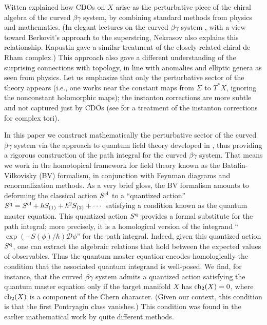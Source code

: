 Witten \cite{WittenCDO} explained how CDOs on $X$ arise as the perturbative piece of the chiral algebra of the curved $\beta\gamma$ system, by combining standard methods from physics and mathematics. (In elegant lectures on the curved $\beta\gamma$ system \cite{Nek}, with a view toward Berkovit's approach to the superstring, Nekrasov also explains this relationship.  Kapustin \cite{KapCDR} gave a similar treatment of the closely-related chiral de Rham complex.) This approach also gave a different understanding of the surprising connections with topology, in line with anomalies and elliptic genera as seen from physics. Let us emphasize that only the perturbative sector of the theory appears (i.e., one works near the constant maps from $\Sigma$ to $T^*X$, ignoring the nonconstant holomorphic maps); the instanton corrections are more subtle and not captured just by CDOs (see \cite{KapOrlov} for a treatment of the instanton corrections for complex tori).

In this paper we construct mathematically the perturbative sector of the curved $\beta\gamma$ system via the approach to quantum field theory developed in \cite{CosBook, CG1, CG2}, thus providing a rigorous construction of the path integral for the curved $\beta\gamma$ system. That means we work in the homotopical framework for field theory known as the Batalin-Vilkovisky (BV) formalism, in conjunction with Feynman diagrams and renormalization methods. As a very brief gloss, the BV formalism amounts to deforming the classical action $S^{\rm cl}$ to a ``quantized action'' $S^{\rm q} = S^{\rm cl} + \hbar S_{(1)} + \hbar^2 S_{(2)} + \cdots$ satisfying a condition known as the quantum master equation. This quantized action $S^{\rm q}$ provides a formal substitute for the path integral; more precisely, it is a homological version of the integrand ``$\exp(-S(\phi)/\hbar) \mathcal{D}\phi$'' for the path integral. Indeed, given this quantized action $S^{\rm q}$, one can extract the algebraic relations that hold between the expected values of observables. Thus the quantum master equation encodes homologically the condition that the associated quantum integrand is well-posed. We find, for instance, that the curved $\beta\gamma$ system admits a quantized action satisfying the quantum master equation only if the target manifold $X$ has ${\rm ch}_2(X) = 0$, where ${\rm ch}_2(X)$ is a component of the Chern character. (Given our context, this condition is that the first Pontryagin class vanishes.) This condition was found in the earlier mathematical work by quite different methods.

